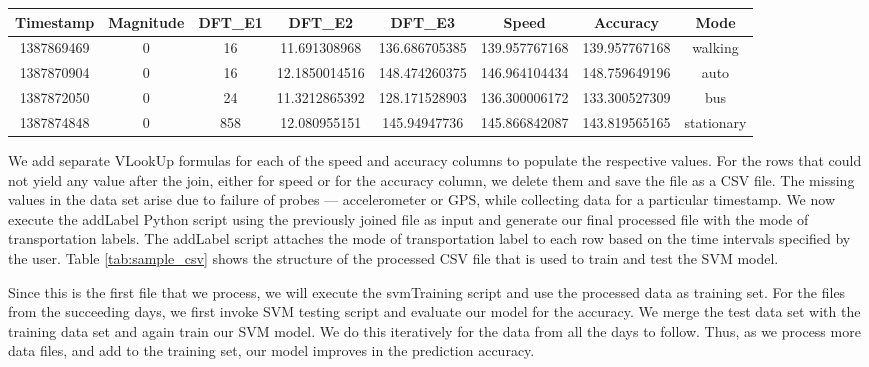 \begin{table*}[bp]
	\centering
	\caption{Structure of the processed file\label{tab:sample_csv}}
  	\begin{tabular}{ |c|c|c|c|c|c|c|c|}
    	\hline
	    \textbf{Timestamp} & \textbf{Magnitude} & \textbf{DFT\_E1} & \textbf{DFT\_E2} & \textbf{DFT\_E3} & \textbf{Speed} & \textbf{Accuracy} & \textbf{Mode} \\ \hline
	    1387869469 & 0 & 16 & 11.691308968 & 136.686705385 & 139.957767168 & 139.957767168 & walking \\ \hline
		1387870904 & 0 & 16 & 12.1850014516 & 148.474260375 & 146.964104434 & 148.759649196 & auto \\ \hline
		1387872050 & 0 & 24 & 11.3212865392 & 128.171528903 & 136.300006172 & 133.300527309 & bus \\ \hline
		1387874848 & 0 & 858 & 12.080955151 & 145.94947736 & 145.866842087 & 143.819565165 & stationary \\
	    \hline
  	\end{tabular}
\end{table*}

We add separate VLookUp formulas for each of the speed and accuracy columns to populate the respective values. For the rows that could not yield any value after the join, either for speed or for the accuracy column, we delete them and save the file as a CSV file. The missing values in the data set arise due to failure of probes --- accelerometer or GPS, while collecting data for a particular timestamp. We now execute the addLabel Python script using the previously joined file as input and generate our final processed file with the mode of transportation labels. The addLabel script attaches the mode of transportation label to each row based on the time intervals specified by the user. Table \ref{tab:sample_csv} shows the structure of the processed CSV file that is used to train and test the SVM model.

Since this is the first file that we process, we will execute the svmTraining script and use the processed data as training set. For the files from the succeeding days, we first invoke SVM testing script and evaluate our model for the accuracy. We merge the test data set with the training data set and again train our SVM model. We do this iteratively for the data from all the days to follow. Thus, as we process more data files, and add to the training set, our model improves in the prediction accuracy.

